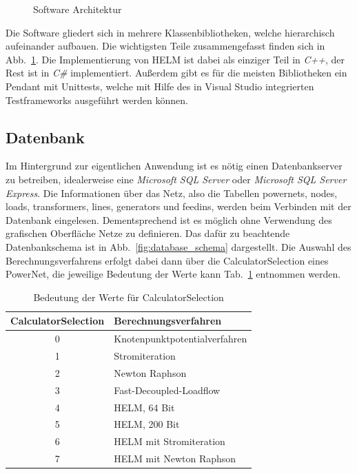 \documentclass[12pt,a4paper]{article}
\newcommand{\reffig}[1]{{Abb.~\ref{#1}}}
\newcommand{\reftab}[1]{{Tab.~\ref{#1}}}
\begin{document}
	\begin{figure}
		\centering
		
		\caption{Software Architektur}
		\label{fig:software_architecture}
	\end{figure}
	Die Software gliedert sich in mehrere Klassenbibliotheken, welche hierarchisch aufeinander aufbauen. Die wichtigsten Teile zusammengefasst finden sich in \reffig{fig:software_architecture}. Die Implementierung von HELM ist dabei als einziger Teil in \emph{C++}, der Rest ist in \emph{C\#} implementiert. Außerdem gibt es für die meisten Bibliotheken ein Pendant mit Unittests, welche mit Hilfe des in Visual Studio integrierten Testframeworks ausgeführt werden können.
	
	\subsection{Datenbank}
	Im Hintergrund zur eigentlichen Anwendung ist es nötig einen Datenbankserver zu betreiben, idealerweise eine \emph{Microsoft SQL Server} oder \emph{Microsoft SQL Server Express}. Die Informationen über das Netz, also die Tabellen powernets, nodes, loads, transformers, lines, generators und feedins, werden beim Verbinden mit der Datenbank eingelesen. Dementsprechend ist es möglich ohne Verwendung des grafischen Oberfläche Netze zu definieren. Das dafür zu beachtende Datenbankschema ist in \reffig{fig:database_schema} dargestellt. Die Auswahl des Berechnungsverfahrens erfolgt dabei dann über die CalculatorSelection eines PowerNet, die jeweilige Bedeutung der Werte kann \reftab{tab:calculator_selection} entnommen werden.
	
	\begin{table}
		\centering
		\begin{tabular}{c|l}
			CalculatorSelection & Berechnungsverfahren \\ \hline
			0 & Knotenpunktpotentialverfahren \\
	        1 & Stromiteration \\
	        2 & Newton Raphson \\
	        3 & Fast-Decoupled-Loadflow \\
	        4 & HELM, 64 Bit \\
	        5 & HELM, 200 Bit \\
	        6 & HELM mit Stromiteration \\
	        7 & HELM mit Newton Raphson
		\end{tabular}
		\caption{Bedeutung der Werte für CalculatorSelection}
		\label{tab:calculator_selection}
	\end{table}
	
\end{document}
